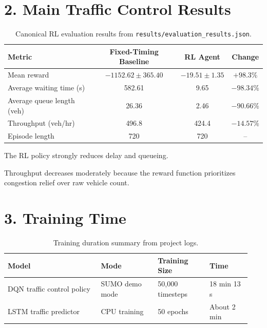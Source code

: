 \documentclass[11pt,a4paper]{article}
\begin{document}
\section*{2. Main Traffic Control Results}
\begin{table}[h!]
\centering
\caption{Canonical RL evaluation results from \texttt{results/evaluation\_results.json}.}
\begin{threeparttable}
\begin{tabular}{lccc}
\toprule
\textbf{Metric} & \textbf{Fixed-Timing Baseline} & \textbf{RL Agent} & \textbf{Change} \\
\midrule
Mean reward & $-1152.62 \pm 365.40$ & $-19.51 \pm 1.35$ & $+98.3\%$ \\
Average waiting time (s) & 582.61 & 9.65 & $-98.34\%$ \\
Average queue length (veh) & 26.36 & 2.46 & $-90.66\%$ \\
Throughput (veh/hr) & 496.8 & 424.4 & $-14.57\%$ \\
Episode length & 720 & 720 & -- \\
\bottomrule
\end{tabular}
\begin{tablenotes}
\footnotesize
\item The RL policy strongly reduces delay and queueing.
\item Throughput decreases moderately because the reward function prioritizes congestion relief over raw vehicle count.
\end{tablenotes}
\end{threeparttable}
\end{table}

\section*{3. Training Time}
\begin{table}[h!]
\centering
\caption{Training duration summary from project logs.}
\begin{tabular}{p{0.36\linewidth} p{0.22\linewidth} p{0.20\linewidth} p{0.16\linewidth}}
\toprule
\textbf{Model} & \textbf{Mode} & \textbf{Training Size} & \textbf{Time} \\
\midrule
DQN traffic control policy & SUMO demo mode & 50{,}000 timesteps & 18 min 13 s \\
LSTM traffic predictor & CPU training & 50 epochs & About 2 min \\
\bottomrule
\end{tabular}
\end{table}
\end{document}
